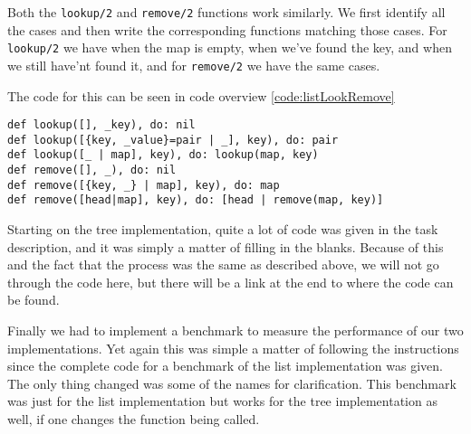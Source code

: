 \documentclass[a4paper,11pt]{article}
\newenvironment{code}{\captionsetup{type=listing}}{}
\begin{document}
Both the {\tt lookup/2} and {\tt remove/2} functions work similarly. We first identify all the cases and then write the corresponding functions matching
those cases.
For {\tt lookup/2} we have when the map is empty, when we've found the key, and when we still have'nt found it, and for {\tt remove/2} we have the same 
cases.

The code for this can be seen in code overview \ref{code:listLookRemove}
\begin{code}
\label{code:listLookRemove}
\begin{verbatim}
def lookup([], _key), do: nil
def lookup([{key, _value}=pair | _], key), do: pair
def lookup([_ | map], key), do: lookup(map, key)
def remove([], _), do: nil
def remove([{key, _} | map], key), do: map
def remove([head|map], key), do: [head | remove(map, key)]
\end{verbatim}
\end{code}

Starting on the tree implementation, quite a lot of code was given in the task description, and it was simply a matter of filling in the blanks.
Because of this and the fact that the process was the same as described above, we will not go through the code here, but there will be a link at the 
end to where the code can be found.

Finally we had to implement a benchmark to measure the performance of our two implementations. Yet again this was simple a matter of following the 
instructions since the complete code for a benchmark of the list implementation was given. The only thing changed was some of the names for 
clarification. This benchmark was just for the list implementation but works for the tree implementation as well, if one changes the function being 
called.
\end{document}
